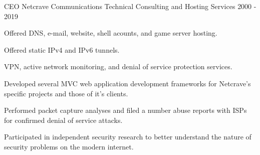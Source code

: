 \begin{cventries}
  \cventry
    {CEO}
    {Netcrave Communications}
    {Technical Consulting and Hosting Services}
    {2000 - 2019}
    {
      \begin{cvitems} 
        \item{Offered DNS, e-mail, website, shell acounts, and game server hosting.}
        \item{Offered static IPv4 and IPv6 tunnels.}
        \item{VPN, active network monitoring, and denial of service protection services.}
        \item{Developed several MVC web application development frameworks for Netcrave's specific projects and those of it's clients.}
        \item{Performed packet capture analyses and filed a number abuse reports with ISPs for confirmed denial of service attacks.}
        \item{Participated in independent security research to better understand the nature of security problems on the modern internet.}
      \end{cvitems}
    }
\end{cventries}

